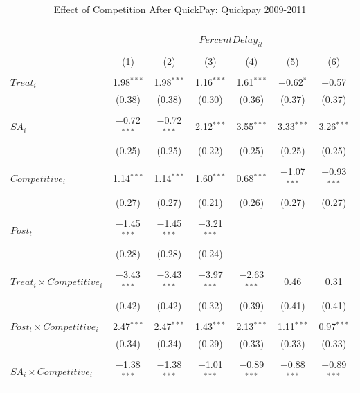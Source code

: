 \documentclass[
]{article}
\begin{document}
\begin{table}[H] \centering 
  \caption{Effect of Competition After QuickPay: Quickpay 2009-2011} 
  \label{} 
\small 
\begin{tabular}{@{\extracolsep{-3pt}}lcccccc} 
\\[-1.8ex]\hline 
\hline \\[-1.8ex] 
\\[-1.8ex] & \multicolumn{6}{c}{$PercentDelay_{it}$  } \\ 
\\[-1.8ex] & (1) & (2) & (3) & (4) & (5) & (6)\\ 
\hline \\[-1.8ex] 
 $Treat_i$ & 1.98$^{***}$ & 1.98$^{***}$ & 1.16$^{***}$ & 1.61$^{***}$ & $-$0.62$^{*}$ & $-$0.57 \\ 
  & (0.38) & (0.38) & (0.30) & (0.36) & (0.37) & (0.37) \\ 
  & & & & & & \\ 
 $SA_i$ & $-$0.72$^{***}$ & $-$0.72$^{***}$ & 2.12$^{***}$ & 3.55$^{***}$ & 3.33$^{***}$ & 3.26$^{***}$ \\ 
  & (0.25) & (0.25) & (0.22) & (0.25) & (0.25) & (0.25) \\ 
  & & & & & & \\ 
 $Competitive_i$ & 1.14$^{***}$ & 1.14$^{***}$ & 1.60$^{***}$ & 0.68$^{***}$ & $-$1.07$^{***}$ & $-$0.93$^{***}$ \\ 
  & (0.27) & (0.27) & (0.21) & (0.26) & (0.27) & (0.27) \\ 
  & & & & & & \\ 
 $Post_t$ & $-$1.45$^{***}$ & $-$1.45$^{***}$ & $-$3.21$^{***}$ &  &  &  \\ 
  & (0.28) & (0.28) & (0.24) &  &  &  \\ 
  & & & & & & \\ 
 $Treat_i \times Competitive_i$ & $-$3.43$^{***}$ & $-$3.43$^{***}$ & $-$3.97$^{***}$ & $-$2.63$^{***}$ & 0.46 & 0.31 \\ 
  & (0.42) & (0.42) & (0.32) & (0.39) & (0.41) & (0.41) \\ 
  & & & & & & \\ 
 $Post_t \times Competitive_i$ & 2.47$^{***}$ & 2.47$^{***}$ & 1.43$^{***}$ & 2.13$^{***}$ & 1.11$^{***}$ & 0.97$^{***}$ \\ 
  & (0.34) & (0.34) & (0.29) & (0.33) & (0.33) & (0.33) \\ 
  & & & & & & \\ 
 $SA_i \times Competitive_i$ & $-$1.38$^{***}$ & $-$1.38$^{***}$ & $-$1.01$^{***}$ & $-$0.89$^{***}$ & $-$0.88$^{***}$ & $-$0.89$^{***}$ \\ 

\end{tabular}
\end{table}
\end{document}
